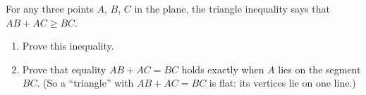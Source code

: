 For any three points $A$, $B$, $C$ in the plane, the triangle inequality says that $AB+AC\ge BC$.
\begin{enumerate}
\item[(a)] Prove this inequality.
\item[(b)] Prove that equality $AB+AC=BC$ holds exactly when $A$ lies on the segment $BC$. (So a ``triangle'' with $AB+AC=BC$ is flat: its vertices lie on one line.)
\end{enumerate}
